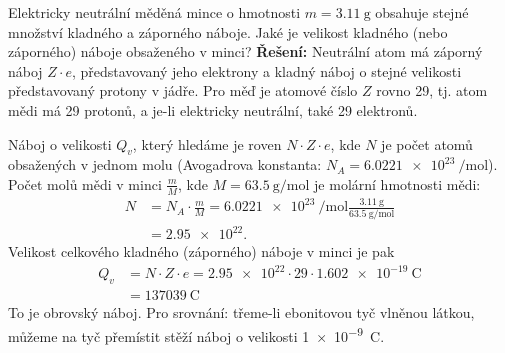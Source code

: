 \begin{mdframed}[style=mdexam]
\begin{example}
  Elektricky neutrální měděná mince o hmotnosti \(m = \qty{3.11}{\g}\) obsahuje stejné množství
  kladného a záporného náboje. Jaké je velikost kladného (nebo záporného) náboje obsaženého v
  minci?\newline  
  \textbf{Řešení:}\newline
  Neutrální atom má záporný náboj \(Z\cdot e\), představovaný jeho elektrony a kladný náboj o stejné
  velikosti představovaný protony v jádře. Pro měď je atomové číslo \(Z\) rovno \num{29}, tj. atom
  mědi má \num{29} protonů, a je-li elektricky neutrální, také \num{29} elektronů.
  
  Náboj o velikosti \(Q_v\), který hledáme je roven \(N\cdot Z\cdot e\), kde \(N\) je počet atomů
  obsažených v  jednom molu (Avogadrova konstanta: \(N_A = \qty{6.0221e23}{\per\mole}\)). Počet molů
  mědi v minci \(\frac{m}{M}\), kde \(M = \qty{63.5}{\g\per\mole}\) je molární hmotnosti mědi:    
  \begin{align*}
    N &=N_A\cdot\frac{m}{M}=\qty{6.0221e23}{\per\mole}\frac{\qty{3.11}{\g}}{\qty{63.5}{\g\per\mole}}\\ 
      &=\num{2.95e22}.
  \end{align*}
  Velikost celkového kladného (záporného) náboje v minci je pak 
  \begin{align*}
    Q_v &= N\cdot Z\cdot e = \num{2.95e22}\cdot\num{29}\cdot\qty{1.602e-19}{\coulomb}    \\
        &= \qty{137039}{\coulomb}
  \end{align*}
  To je obrovský náboj. Pro srovnání: třeme-li ebonitovou tyč vlněnou látkou, můžeme na tyč
  přemístit stěží náboj o velikosti \qty{1e-9}{\coulomb}.
\end{example} 
\end{mdframed}
